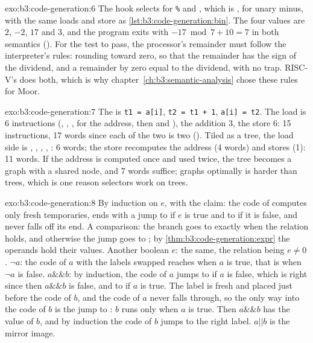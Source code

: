 \begin{solution}{exo:b3:code-generation:6}
The hook selects  for \texttt{\%} and , which is , for unary minus, with the same loads and store as \cref{lst:b3:code-generation:bin}. The four values are $2$, $-2$, $17$ and $3$, and the program exits with $-17 \bmod 7 + 10 = 7$ in both semantics (). For the test to pass, the processor's remainder must follow the interpreter's rules: rounding toward zero, so that the remainder has the sign of the dividend, and a remainder by zero equal to the dividend, with no trap. RISC-V's  does both, %
which is why chapter~\ref{ch:b3:semantic-analysis} chose these rules for Moor.
\end{solution}

\begin{solution}{exo:b3:code-generation:7}
The  is \texttt{t1 = a[i]}, \texttt{t2 = t1 + 1}, \texttt{a[i] = t2}. The load is 6 instructions (, , ,  for the address, then  and ), the addition 3, the store 6: 15 instructions, 17 words since each of the two  is two (). Tiled as a tree, the load side is , , , , : 6 words; the store recomputes the address (4 words) and stores (1): 11 words. If the address is computed once and used twice, the tree becomes a graph with a shared node, and 7 words suffice;  graphs optimally is harder than  trees, which is one reason selectors work on trees.
\end{solution}

\begin{solution}{exo:b3:code-generation:8}
By induction on $e$, with the claim: the code of  computes only fresh temporaries, ends with a jump to  if $e$ is true and to  if it is false, and never falls off its end. A comparison: the branch goes to  exactly when the relation holds, and otherwise the jump goes to ; by \cref{thm:b3:code-generation:expr} the operands hold their values. Another boolean $e$: the same, the relation being $e \ne 0$. $\lnot a$: the code of $a$ with the labels swapped reaches  when $a$ is true, that is when $\lnot a$ is false. $a \mathbin{\&\&} b$: by induction, the code of $a$ jumps to  if $a$ is false, which is right since then $a \mathbin{\&\&} b$ is false, and to  if $a$ is true. The label  is fresh and placed just before the code of $b$, and the code of $a$ never falls through, so the only way into the code of $b$ is the jump to : $b$ runs only when $a$ is true. Then $a \mathbin{\&\&} b$ has the value of $b$, and by induction the code of $b$ jumps to the right label. $a \mathbin{||} b$ is the mirror image.
\end{solution}


